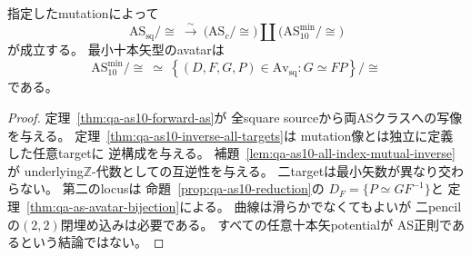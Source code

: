 \begin{theorem}[独立ASクラスの全単射と十本矢avatar]
\label{thm:qa-as10-global-bijection}
指定したmutationによって
\begin{equation}
 \mathrm{AS}_{\mathrm{sq}}/\cong
 \ \xrightarrow{\ \sim\ }\
 \bigl(\mathrm{AS}_{c}/\cong\bigr)
 \amalg
 \bigl(\mathrm{AS}_{10}^{\mathrm{min}}/\cong\bigr)
 \label{eq:qa-as10-global-bijection}
\end{equation}
が成立する。
最小十本矢型のavatarは
\begin{equation}
 \mathrm{AS}_{10}^{\mathrm{min}}/\cong
 \ \simeq\
 \left\{(D,F,G,P)\in\mathrm{Av}_{\mathrm{sq}}
       :G\simeq FP\right\}/\cong
 \label{eq:qa-as10-avatar-locus}
\end{equation}
である。
\end{theorem}
\begin{proof}
定理~\ref{thm:qa-as10-forward-as}が
全square sourceから両ASクラスへの写像を与える。
定理~\ref{thm:qa-as10-inverse-all-targets}は
mutation像とは独立に定義した任意targetに
逆構成を与える。
補題~\ref{lem:qa-as10-all-index-mutual-inverse}が
underlying$\mathbb Z$-代数としての互逆性を与える。
二targetは最小矢数が異なり交わらない。
第二のlocusは
命題~\ref{prop:qa-as10-reduction}の
$D_F=\{P\simeq GF^{-1}\}$と
定理~\ref{thm:qa-as-avatar-bijection}による。
曲線は滑らかでなくてもよいが
二pencilの$(2,2)$閉埋め込みは必要である。
すべての任意十本矢potentialが
AS正則であるという結論ではない。
\end{proof}


